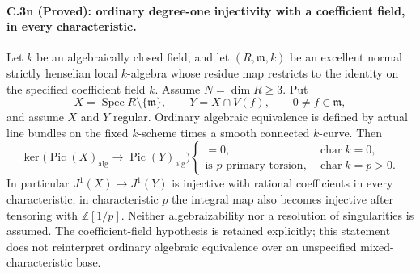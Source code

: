 \paragraph{C.3n (Proved): ordinary degree-one injectivity with a coefficient field, in every characteristic.}
Let $k$ be an algebraically closed field, and let
$(R,\mathfrak m,k)$ be an excellent normal strictly
henselian local $k$-algebra whose residue map restricts
to the identity on the specified coefficient field $k$.
Assume $N=\dim R\ge3$. Put
\[
 X=\operatorname{Spec}R\setminus\{\mathfrak m\},
 \qquad Y=X\cap V(f),\qquad 0\ne f\in\mathfrak m,
\]
and assume $X$ and $Y$ regular. Ordinary algebraic
equivalence is defined by actual line bundles on
the fixed $k$-scheme times a smooth connected
$k$-curve. Then
\begin{equation}\label{eq:C3-general-ordinary-injectivity}
 \ker\bigl(\operatorname{Pic}(X)_{\mathrm{alg}}
             \longrightarrow
            \operatorname{Pic}(Y)_{\mathrm{alg}}\bigr)
 \begin{cases}
   =0,&\operatorname{char}k=0,\\
   \text{is $p$-primary torsion},&\operatorname{char}k=p>0.
 \end{cases}
\end{equation}
In particular $J^1(X)\to J^1(Y)$ is injective with
rational coefficients in every characteristic;
in characteristic $p$ the integral map also becomes
injective after tensoring with $\mathbb Z[1/p]$.
Neither algebraizability nor a resolution of
singularities is assumed. The coefficient-field
hypothesis is retained explicitly; this statement
does not reinterpret ordinary algebraic equivalence
over an unspecified mixed-characteristic base.

